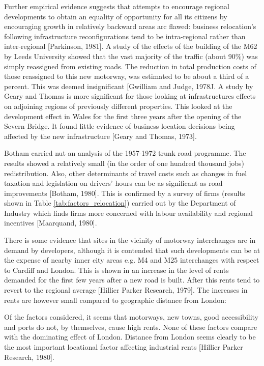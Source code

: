 Further empirical evidence suggests that attempts to encourage regional developments to obtain an equality of opportunity for all its citizens by encouraging growth in relatively backward areas arc flawed: business relocation's following infrastructure reconfigurations tend to be intra-regional rather than inter-regional [Parkinson, 1981]. A study of the effects of the building of the M62 by Leeds University showed that the vast majority of the traffic (about 90\%) was simply reassigned from existing roads. The reduction in total production costs of those reassigned to this new motorway, was estimated to be about a third of a percent. This was deemed insignificant [Gwilliam and Judge, 1978J. A study by Geary and Thomas is more significant for those looking at infrastructures effects on adjoining regions of previously different properties. This looked at the development effect in Wales for the first three years after the opening of the Severn Bridge. It found little evidence of business location decisions being affected by the new infrastructure [Geary and Thomas, 1973].

Botham carried nut an analysis of the 1957-1972 trunk road programme. The results showed a relatively small (in the order of one hundred thousand jobs) redistribution. Also, other determinants of travel costs such as changes in fuel taxation and legislation on drivers' hours can be as significant as road improvements [Botham, 1980]. This is confirmed by a survey of firms (results shown in Table \ref{tab:factors_relocation}) carried out by the Department of Industry which finds firms more concerned with labour availability and regional incentives [Maarquand, 1980].



There is some evidence that sites in the vicinity of motorway interchanges are in demand by developers, although it is contended that such developments can be at the expense of nearby inner city areas e.g. M4 and M25 interchanges with respect to Cardiff and London. This is shown in an increase in the level of rents demanded for the first few years after a new road is built. After this rents tend to revert to the regional average [Hillier Parker Research, 1979]. The increases in rents are however small compared to geographic distance from London:

\begin{displayquote}
Of the factors considered, it seems that motorways, new towns, good accessibility and ports do not, by themselves, cause high rents. None of these factors compare with the dominating effect of London. Distance from London seems clearly to be the most important locational factor affecting industrial rents [Hillier Parkcr Research, 1980].
\end{displayquote}

